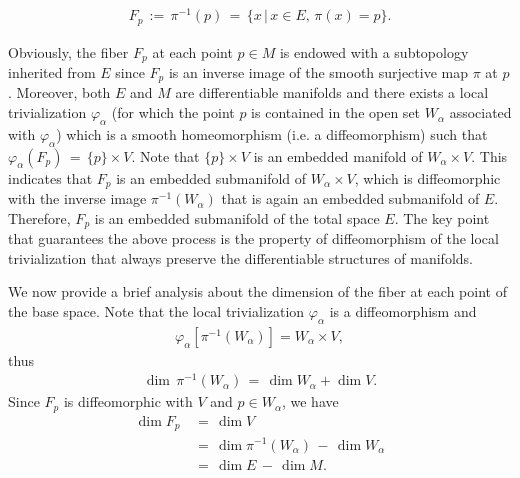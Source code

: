 \begin{equation}
    \begin{split}
        F_{p}\,:=\,\pi^{-1}\left(p\right)\,=\,\{x\,|\,x\in E,\,\pi\left(x\right)=p\}.
    \end{split}
\end{equation}
\par Obviously, the fiber $F_{p}$ at each point $p\in M$ is endowed with a subtopology inherited from $E$ since $F_{p}$ is an inverse image of the smooth surjective map $\pi$ at $p$. Moreover, both $E$ and $M$ are differentiable manifolds and there exists a local trivialization $\varphi_{\alpha}$ (for which the point $p$ is contained in the open set $W_{\alpha}$ associated with $\varphi_{\alpha}$) which is a smooth homeomorphism (i.e. a diffeomorphism) such that $\varphi_{\alpha}\left(F_{p}\right)\,=\,\{p\}\times V$. Note that $\{p\}\times V$ is an embedded manifold of $W_{\alpha}\times V$. This indicates that $F_{p}$ is an embedded submanifold of $W_{\alpha}\times V$, which is diffeomorphic with the inverse image $\pi^{-1}\left(W_{\alpha}\right)$ that is again an embedded submanifold of $E$. Therefore, $F_{p}$ is an embedded submanifold of the total space $E$. The key point that guarantees the above process is the property of diffeomorphism of the local trivialization that always preserve the differentiable structures of manifolds.
\par We now provide a brief analysis about the dimension of the fiber at each point of the base space. Note that the local trivialization $\varphi_{\alpha}$ is a diffeomorphism and
\begin{equation}
    \begin{split}
        \varphi_{\alpha}[\pi^{-1}\left(W_{\alpha}\right)]=W_{\alpha}\times V,
    \end{split}
\end{equation}
thus 
\begin{equation}
    \begin{split}
        \dim\,\pi^{-1}\left(W_{\alpha}\right)\,=\,\dim{W_{\alpha}}+\dim{V}.
    \end{split}
\end{equation}
Since $F_{p}$ is diffeomorphic with $V$ and $p\in W_{\alpha}$, we have
\begin{equation}\label{dimension of fiber at each point}
    \begin{split}
        \dim{F_{p}}\,&=\,\dim{V}  \\
        &=\,\dim{\pi^{-1}\left(W_{\alpha}\right)}\,-\,\dim{W_{\alpha}}  \\
        &=\,\dim{E}\,-\,\dim{M}.
    \end{split}
\end{equation}
